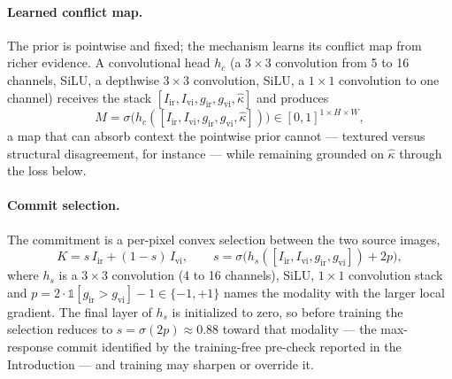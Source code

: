 \documentclass[pdflatex,sn-mathphys-num]{sn-jnl}
\theoremstyle{thmstyleone}%
\theoremstyle{thmstyletwo}%
\theoremstyle{thmstylethree}%
\begin{document}
\paragraph{Learned conflict map.}
The prior is pointwise and fixed; the mechanism learns its conflict map from richer evidence. A convolutional head $h_c$ (a $3\times 3$ convolution from 5 to 16 channels, SiLU, a depthwise $3\times 3$ convolution, SiLU, a $1\times 1$ convolution to one channel) receives the stack $[I_{\mathrm{ir}}, I_{\mathrm{vi}}, g_{\mathrm{ir}}, g_{\mathrm{vi}}, \hat\kappa]$ and produces
\begin{equation}\label{eq:M}
M = \sigma\big(h_c([I_{\mathrm{ir}}, I_{\mathrm{vi}}, g_{\mathrm{ir}}, g_{\mathrm{vi}}, \hat\kappa])\big) \in [0,1]^{1\times H\times W},
\end{equation}
a map that can absorb context the pointwise prior cannot --- textured versus structural disagreement, for instance --- while remaining grounded on $\hat\kappa$ through the loss below.

\paragraph{Commit selection.}
The commitment is a per-pixel convex selection between the two source images,
\begin{equation}\label{eq:commit}
K = s\, I_{\mathrm{ir}} + (1-s)\, I_{\mathrm{vi}}, \qquad s = \sigma\big(h_s([I_{\mathrm{ir}}, I_{\mathrm{vi}}, g_{\mathrm{ir}}, g_{\mathrm{vi}}]) + 2p\big),
\end{equation}
where $h_s$ is a $3\times 3$ convolution (4 to 16 channels), SiLU, $1\times 1$ convolution stack and $p = 2\cdot\mathbb{1}[g_{\mathrm{ir}} > g_{\mathrm{vi}}] - 1 \in \{-1, +1\}$ names the modality with the larger local gradient. The final layer of $h_s$ is initialized to zero, so before training the selection reduces to $s = \sigma(2p) \approx 0.88$ toward that modality --- the max-response commit identified by the training-free pre-check reported in the Introduction --- and training may sharpen or override it.
\end{document}
